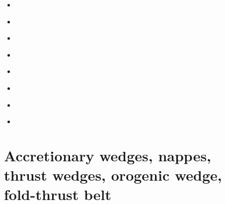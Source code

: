 \begin{scriptsize}
\begin{itemize}
\item[\twothousandeight] 
\cite{lejm08} 
\item[\twothousandnine] 
\cite{ligt09}
\cite{gogk09}
\item[\twothousandten] 
\cite{vayb10}
\item[\twothousandeleven] 
\cite{ligt11}
\cite{vacg11}
\item[\twothousandthirteen] 
\cite{vagc13}
\item[\twothousandfourteen] 
\cite{gobg14}
\cite{yadl14}
\item[\twothousandnineteen] 
\cite{neum19}
\cite{vayu19}
\item[\twothousandtwenty] 
\cite{onlw20}
\end{itemize}
\end{scriptsize}

\section{Accretionary wedges, nappes, thrust wedges, orogenic wedge, fold-thrust belt} 

